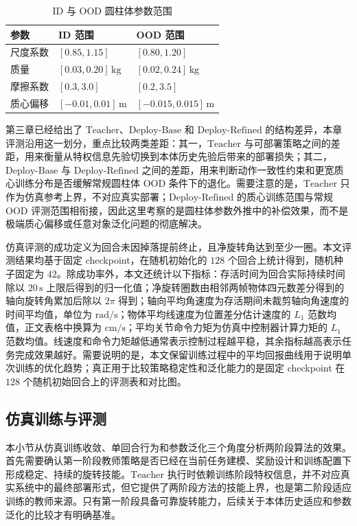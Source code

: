 \begin{table}[htbp]
    \centering
    \caption{ID 与 OOD 圆柱体参数范围}
    \label{tab:chapter4_id_ood_ranges}
    \begin{tabular}{p{}p{}p{}}
        \toprule
        参数 & ID 范围 & OOD 范围 \\
        \midrule
        尺度系数 & \([0.85,1.15]\) & \([0.80,1.20]\) \\
        质量 & \([0.03,0.20]\,\mathrm{kg}\) & \([0.02,0.24]\,\mathrm{kg}\) \\
        摩擦系数 & \([0.3,3.0]\) & \([0.2,3.5]\) \\
        质心偏移 & \([-0.01,0.01]\,\mathrm{m}\) & \([-0.015,0.015]\,\mathrm{m}\) \\
        \bottomrule
    \end{tabular}
\end{table}

第三章已经给出了 \(\mathrm{Teacher}\)、\(\mathrm{Deploy\text{-}Base}\) 和 \(\mathrm{Deploy\text{-}Refined}\) 的结构差异，本章评测沿用这一划分，重点比较两类差距：其一，\(\mathrm{Teacher}\) 与可部署策略之间的差距，用来衡量从特权信息先验切换到本体历史先验后带来的部署损失；其二，\(\mathrm{Deploy\text{-}Base}\) 与 \(\mathrm{Deploy\text{-}Refined}\) 之间的差距，用来判断动作一致性约束和更宽质心训练分布是否缓解常规圆柱体 OOD 条件下的退化。需要注意的是，\(\mathrm{Teacher}\) 只作为仿真参考上界，不对应真实部署；\(\mathrm{Deploy\text{-}Refined}\) 的质心训练范围与常规 OOD 评测范围相衔接，因此这里考察的是圆柱体参数外推中的补偿效果，而不是极端质心偏移或任意对象泛化问题的彻底解决。

仿真评测的成功定义为回合未因掉落提前终止，且净旋转角达到至少一圈。本文评测结果均基于固定 checkpoint，在随机初始化的 \(128\) 个回合上统计得到，随机种子固定为 \(42\)。除成功率外，本文还统计以下指标：存活时间为回合实际持续时间除以 \(20\,\mathrm{s}\) 上限后得到的归一化值；净旋转圈数由相邻两帧物体四元数差分得到的轴向旋转角累加后除以 \(2\pi\) 得到；轴向平均角速度为存活期间未裁剪轴向角速度的时间平均值，单位为 \(\mathrm{rad/s}\)；物体平均线速度为位置差分估计速度的 \(L_1\) 范数均值，正文表格中换算为 \(\mathrm{cm/s}\)；平均关节命令力矩为仿真中控制器计算力矩的 \(L_1\) 范数均值。线速度和命令力矩越低通常表示控制过程越平稳，其余指标越高表示任务完成效果越好。需要说明的是，本文保留训练过程中的平均回报曲线用于说明单次训练的优化趋势；真正用于比较策略稳定性和泛化能力的是固定 checkpoint 在 \(128\) 个随机初始回合上的评测表和对比图。

\subsection{仿真训练与评测}
\thesisbodyfont
本小节从仿真训练收敛、单回合行为和参数泛化三个角度分析两阶段算法的效果。首先需要确认第一阶段教师策略是否已经在当前任务建模、奖励设计和训练配置下形成稳定、持续的旋转技能。\(\mathrm{Teacher}\) 执行时依赖训练阶段特权信息，并不对应真实系统中的最终部署形式，但它提供了两阶段方法的技能上界，也是第二阶段适应训练的教师来源。只有第一阶段具备可靠旋转能力，后续关于本体历史适应和参数泛化的比较才有明确基准。

